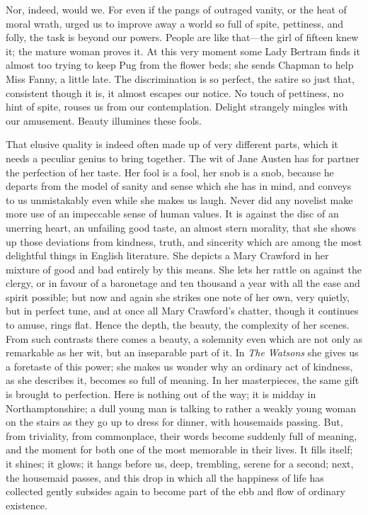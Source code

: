Nor, indeed, would we. For even if the pangs of outraged vanity, or the heat of moral wrath, urged us to improve away a world so full of spite, pettiness, and folly, the task is beyond our powers. People are like that—the girl of fifteen knew it; the mature woman proves it. At this very moment some Lady Bertram finds it almost too trying to keep Pug from the flower beds; she sends Chapman to help Miss Fanny, a little late. The discrimination is so perfect, the satire so just that, consistent though it is, it almost escapes our notice. No touch of pettiness, no hint of spite, rouses us from our contemplation. Delight strangely mingles with our amusement. Beauty illumines these fools.

That elusive quality is indeed often made up of very different parts, which it needs a peculiar genius to bring together. The wit of Jane Austen has for partner the perfection of her taste. Her fool is a fool, her snob is a snob, because he departs from the model of sanity and sense which she has in mind, and conveys to us unmistakably even while she makes us laugh. Never did any novelist make more use of an impeccable sense of human values. It is against the disc of an unerring heart, an unfailing good taste, an almost stern morality, that she shows up those deviations from kindness, truth, and sincerity which are among the most delightful things in English literature. She depicts a Mary Crawford in her mixture of good and bad entirely by this means. She lets her rattle on against the clergy, or in favour of a baronetage and ten thousand a year with all the ease and spirit possible; but now and again she strikes one note of her own, very quietly, but in perfect tune, and at once all Mary Crawford's chatter, though it continues to amuse, rings flat. Hence the depth, the beauty, the complexity of her scenes. From such contrasts there comes a beauty, a solemnity even which are not only as remarkable as her wit, but an inseparable part of it. In \textit{The Watsons} she gives us a foretaste of this power; she makes us wonder why an ordinary act of kindness, as she describes it, becomes so full of meaning. In her masterpieces, the same gift is brought to perfection. Here is nothing out of the way; it is midday in Northamptonshire; a dull young man is talking to rather a weakly young woman on the stairs as they go up to dress for dinner, with housemaids passing. But, from triviality, from commonplace, their words become suddenly full of meaning, and the moment for both one of the most memorable in their lives. It fills itself; it shines; it glows; it hangs before us, deep, trembling, serene for a second; next, the housemaid passes, and this drop in which all the happiness of life has collected gently subsides again to become part of the ebb and flow of ordinary existence.

